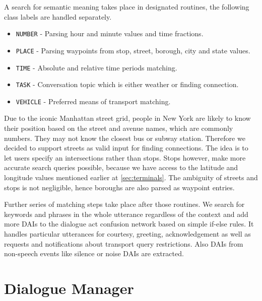 A search for semantic meaning takes place in designated routines, the following class labels are handled separately.

\begin{itemize}
	\item \texttt{NUMBER} - Parsing hour and minute values and time fractions.
	\item \texttt{PLACE} - Parsing waypoints from stop, street, borough, city and state values.
	\item \texttt{TIME} - Absolute and relative time periods matching.
	\item \texttt{TASK} - Conversation topic  which is either weather or finding connection.
	\item \texttt{VEHICLE} - Preferred means of transport matching.
\end{itemize}

Due to the iconic Manhattan street grid, people in New York are likely to know their position based on the street and avenue names, which are commonly numbers.
They may not know the closest bus or subway station.
Therefore we decided to support streets as valid input for finding connections.
The idea is to let users specify an intersections rather than stops. Stops however, make more accurate search queries possible, because we have access to the latitude and longitude values mentioned earlier at \ref{sec:terminals}.
The ambiguity of streets and stops is not negligible, hence boroughs are also parsed as waypoint entries.

Further series of matching steps take place after those routines.
We search for keywords and phrases in the whole utterance regardless of the context and add more DAIs to the dialogue act confusion network based on simple if-else rules.
It handles particular utterances for courtesy, greeting, acknowledgement as well as requests and notifications about transport query restrictions.
Also DAIs from non-speech events like silence or noise DAIs are extracted.

\section{Dialogue Manager}

